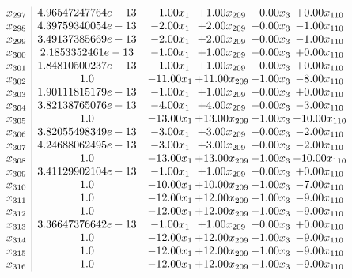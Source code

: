 \documentclass[8pt]{article}
\begin{document}
\[\begin{array}{c| c c@{\hskip 2pt} c@{\hskip 2pt} c@{\hskip 2pt} c@{\hskip 2pt} }
 x_{297}   &  4.96547247764e-13 & -1.00 x_{1} & +  1.00 x_{209} & +  0.00 x_{3} & +  0.00 x_{110}\\
 x_{298}   &  4.39759340054e-13 & -2.00 x_{1} & +  2.00 x_{209} & -0.00 x_{3} & -1.00 x_{110}\\
 x_{299}   &  3.49137385669e-13 & -2.00 x_{1} & +  2.00 x_{209} & -0.00 x_{3} & -1.00 x_{110}\\
 x_{300}   &  2.1853352461e-13 & -1.00 x_{1} & +  1.00 x_{209} & -0.00 x_{3} & +  0.00 x_{110}\\
 x_{301}   &  1.84810500237e-13 & -1.00 x_{1} & +  1.00 x_{209} & -0.00 x_{3} & +  0.00 x_{110}\\
 x_{302}   &  1.0 & -11.00 x_{1} & + 11.00 x_{209} & -1.00 x_{3} & -8.00 x_{110}\\
 x_{303}   &  1.90111815179e-13 & -1.00 x_{1} & +  1.00 x_{209} & -0.00 x_{3} & +  0.00 x_{110}\\
 x_{304}   &  3.82138765076e-13 & -4.00 x_{1} & +  4.00 x_{209} & -0.00 x_{3} & -3.00 x_{110}\\
 x_{305}   &  1.0 & -13.00 x_{1} & + 13.00 x_{209} & -1.00 x_{3} & -10.00 x_{110}\\
 x_{306}   &  3.82055498349e-13 & -3.00 x_{1} & +  3.00 x_{209} & -0.00 x_{3} & -2.00 x_{110}\\
 x_{307}   &  4.24688062495e-13 & -3.00 x_{1} & +  3.00 x_{209} & -0.00 x_{3} & -2.00 x_{110}\\
 x_{308}   &  1.0 & -13.00 x_{1} & + 13.00 x_{209} & -1.00 x_{3} & -10.00 x_{110}\\
 x_{309}   &  3.41129902104e-13 & -1.00 x_{1} & +  1.00 x_{209} & -0.00 x_{3} & +  0.00 x_{110}\\
 x_{310}   &  1.0 & -10.00 x_{1} & + 10.00 x_{209} & -1.00 x_{3} & -7.00 x_{110}\\
 x_{311}   &  1.0 & -12.00 x_{1} & + 12.00 x_{209} & -1.00 x_{3} & -9.00 x_{110}\\
 x_{312}   &  1.0 & -12.00 x_{1} & + 12.00 x_{209} & -1.00 x_{3} & -9.00 x_{110}\\
 x_{313}   &  3.36647376642e-13 & -1.00 x_{1} & +  1.00 x_{209} & -0.00 x_{3} & +  0.00 x_{110}\\
 x_{314}   &  1.0 & -12.00 x_{1} & + 12.00 x_{209} & -1.00 x_{3} & -9.00 x_{110}\\
 x_{315}   &  1.0 & -12.00 x_{1} & + 12.00 x_{209} & -1.00 x_{3} & -9.00 x_{110}\\
 x_{316}   &  1.0 & -12.00 x_{1} & + 12.00 x_{209} & -1.00 x_{3} & -9.00 x_{110}\\

\end{array}\]
\end{document}
